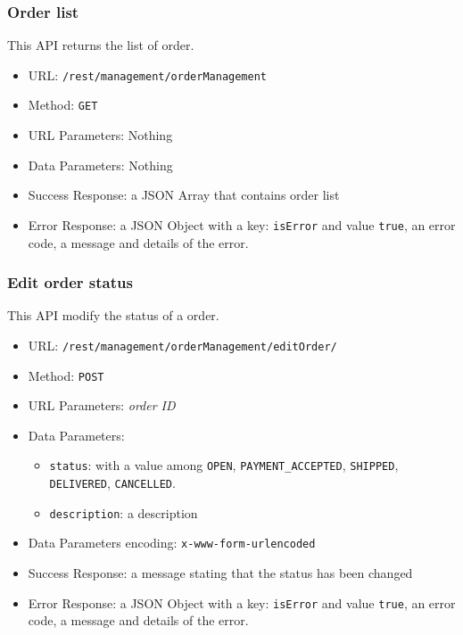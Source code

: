 

\subsubsection*{Order list}
This API returns the list of order.

\begin{itemize}
    \item URL: \texttt{/rest/management/orderManagement}
    \item Method: \texttt{GET}
    \item URL Parameters: Nothing
    \item Data Parameters: Nothing
    \item Success Response: a JSON Array that contains order list
    \item Error Response: a JSON Object with a key: \texttt{isError}  and value \texttt{true}, an error code, a message and details of the error.
\end{itemize}

\subsubsection*{Edit order status}
This API modify the status of a order.

\begin{itemize}
    \item URL: \texttt{/rest/management/orderManagement/editOrder/}
    \item Method: \texttt{POST}
    \item URL Parameters:  \textit{order ID}
    \item Data Parameters:
    \begin{itemize}
       \item \texttt{status}: with a value among \texttt{OPEN}, \texttt{PAYMENT\_ACCEPTED}, \texttt{SHIPPED}, \texttt{DELIVERED}, \texttt{CANCELLED}.
       \item \texttt{description}: a description
    \end{itemize}
    \item Data Parameters encoding: \texttt{x-www-form-urlencoded}
    \item Success Response: a message stating that the status has been changed
    \item Error Response: a JSON Object with a key: \texttt{isError}  and value \texttt{true}, an error code, a message and details of the error.
\end{itemize}


